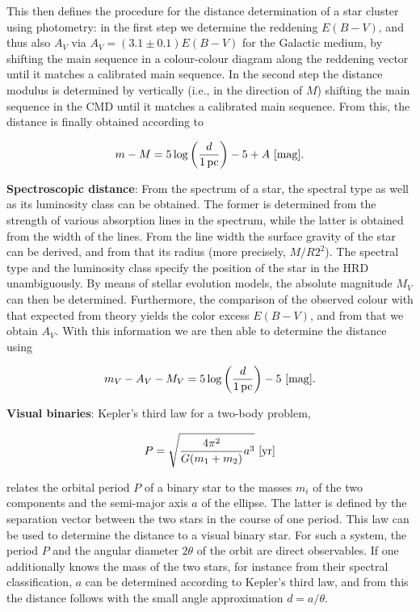 \documentclass[a4paper,11pt]{article}
\begin{document}
{\noindent}This then defines the procedure for the distance determination of a star cluster using photometry: in the first step we determine the reddening $E(B-V)$, and thus also $A_V$ via $A_V=(3.1\pm0.1)E(B-V)$ for the Galactic medium, by shifting the main sequence in a colour-colour diagram along the reddening vector until it matches a calibrated main sequence. In the second step the distance modulus is determined by vertically (i.e., in the direction of $M$) shifting the main sequence in the CMD until it matches a calibrated main sequence. From this, the distance is finally obtained according to

\begin{align*}
    m-M = 5\log\left(\frac{d}{1\,{\rm pc}}\right)-5+A ~ [{\rm mag}].
\end{align*}

{\noindent}\textbf{Spectroscopic distance}: From the spectrum of a star, the spectral type as well as its luminosity class can be obtained. The former is determined from the strength of various absorption lines in the spectrum, while the latter is obtained from the width of the lines. From the line width the surface gravity of the star can be derived, and from that its radius (more precisely, $M/R2^2$). The spectral type and the luminosity class specify the position of the star in the HRD unambiguously. By means of stellar evolution models, the absolute magnitude $M_V$ can then be determined. Furthermore, the comparison of the observed colour with that expected from theory yields the color excess $E(B-V)$, and from that we obtain $A_V$. With this information we are then able to determine the distance using

\begin{align*}
    m_V-A_V-M_V = 5\log\left(\frac{d}{1\,{\rm pc}}\right)-5 ~ [{\rm mag}].
\end{align*}

{\noindent}\textbf{Visual binaries}: Kepler’s third law for a two-body problem,

\begin{align*}
    P = \sqrt{\frac{4\pi^2}{G(m_1+m_2)}a^3} ~ [{\rm yr}]
\end{align*}

{\noindent}relates the orbital period $P$ of a binary star to the masses $m_i$ of the two components and the semi-major axis $a$ of the ellipse. The latter is defined by the separation vector between the two stars in the course of one period. This law can be used to determine the distance to a visual binary star. For such a system, the period $P$ and the angular diameter $2\theta$ of the orbit are direct observables. If one additionally knows the mass of the two stars, for instance from their spectral classification, $a$ can be determined according to Kepler's third law, and from this the distance follows with the small angle approximation $d=a/\theta$.
\end{document}
